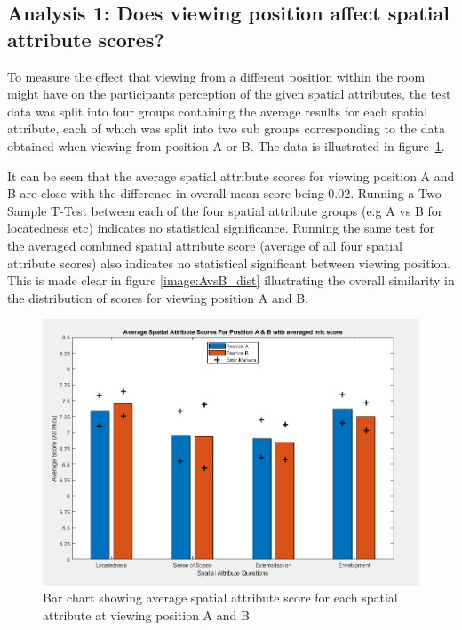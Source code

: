 















\subsection{Analysis 1: Does viewing position affect spatial attribute scores?}
	\label{ana1}

		To measure the effect that viewing from a different position within the room might have on the participants perception of the given spatial attributes, the test data was split into four groups containing the average results for each spatial attribute, each of which was split into two sub groups corresponding to the data obtained when viewing from position A or B. The data is illustrated in figure~\ref{image:AvsB}.

		It can be seen that the average spatial attribute scores for viewing position A and B are close with the difference in overall mean score being 0.02. Running a Two-Sample T-Test between each of the four spatial attribute groups (e.g A vs B for locatedness etc) indicates no statistical significance. Running the same test for the averaged combined spatial attribute score (average of all four spatial attribute scores) also indicates no statistical significant between viewing position. This is made clear in figure \ref{image:AvsB_dist} illustrating the overall similarity in the distribution of scores for viewing position A and B. \\
		\begin{figure}
			\includegraphics[width=\linewidth]{images/plots/AvB_Bar_error.PNG}
			\caption{Bar chart showing average spatial attribute score for each spatial attribute at viewing position A and B}
			\label{image:AvsB} 
		\end{figure}
		
